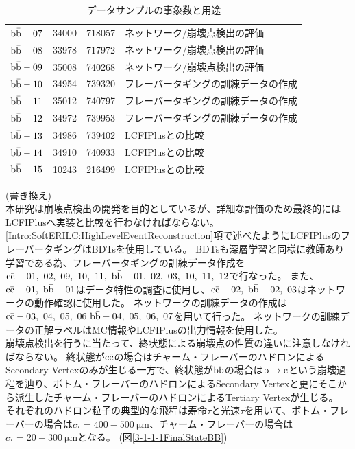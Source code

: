 \begin{table}[htb]
\begin{tabular}{c c c l}
    $\rm b\bar{b}-07$ & 34000 & 718057 & ネットワーク/崩壊点検出の評価\\
    $\rm b\bar{b}-08$ & 33978 & 717972 & ネットワーク/崩壊点検出の評価\\ 
    $\rm b\bar{b}-09$ & 35008 & 740268 & ネットワーク/崩壊点検出の評価\\ \hline
    $\rm b\bar{b}-10$ & 34954 & 739320 & フレーバータギングの訓練データの作成\\ 
    $\rm b\bar{b}-11$ & 35012 & 740797 & フレーバータギングの訓練データの作成\\ 
    $\rm b\bar{b}-12$ & 34972 & 739953 & フレーバータギングの訓練データの作成\\ \hline
    $\rm b\bar{b}-13$ & 34986 & 739402 & LCFIPlusとの比較\\ 
    $\rm b\bar{b}-14$ & 34910 & 740933 & LCFIPlusとの比較\\ 
    $\rm b\bar{b}-15$ & 10243 & 216499 & LCFIPlusとの比較\\ \hline
  \end{tabular}
  \caption{データサンプルの事象数と用途}
  \label{DataSamples}
\end{table}

(書き換え)\\
本研究は崩壊点検出の開発を目的としているが、詳細な評価のため最終的にはLCFIPlusへ実装と比較を行わなければならない。
\ref{Intro:SoftERILC:HighLevelEventReconstruction}項で述べたようにLCFIPlusのフレーバータギングはBDTsを使用している。
BDTsも深層学習と同様に教師あり学習である為、フレーバータギングの訓練データ作成を$\rm c\bar{c}-01,\ 02,\ 09,\ 10,\ 11,\ \rm b\bar{b}-01,\ 02,\ 03,\ 10,\ 11,\ 12$で行なった。
また、$\rm c\bar{c}-01,\ b\bar{b}-01$はデータ特性の調査に使用し、$\rm c\bar{c}-02,\ b\bar{b}-02,\ 03$はネットワークの動作確認に使用した。
ネットワークの訓練データの作成は$\rm c\bar{c}-03,\ 04,\ 05,\ 06\ b\bar{b}-04,\ 05,\ 06,\ 07$を用いて行った。
ネットワークの訓練データの正解ラベルはMC情報やLCFIPlusの出力情報を使用した。\\

崩壊点検出を行うに当たって、終状態による崩壊点の性質の違いに注意しなければならない。
終状態が$\rm c\bar{c}$の場合はチャーム・フレーバーのハドロンによるSecondary Vertexのみが生じる一方で、終状態が$\rm b\bar{b}$の場合は$\rm b \to c$という崩壊過程を辿り、ボトム・フレーバーのハドロンによるSecondary Vertexと更にそこから派生したチャーム・フレーバーのハドロンによるTertiary Vertexが生じる。
それぞれのハドロン粒子の典型的な飛程は寿命$\tau$と光速$\tau$を用いて、ボトム・フレーバーの場合は$c \tau = 400-500 \ \mathrm{\mu m}$、チャーム・フレーバーの場合は$c \tau = 20-300 \ \mathrm{\mu m}$となる。 (図\ref{3-1-1-1FinalStateBB})

